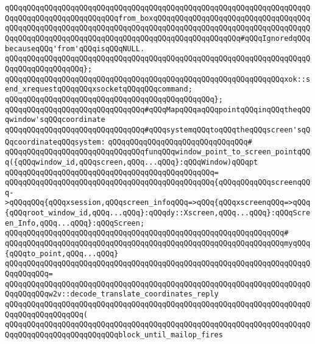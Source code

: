 \verb|qQQqqQQqqQQqqQQqqQQqqQQqqQQqqQQqqQQqqQQqqQQqqQQqqQQqqQQqqQQqqQQqqQQqqQQqqQQqqQQqqQQqqQQqqQQqqQQqfrom_boxqQQqqQQqqQQqqQQqqQQqqQQqqQQqqQQqqQQqqQQqqQQqqQQqqQQqqQQqqQQqqQQqqQQqqQQqqQQqqQQqqQQqqQQqqQQqqQQqqQQqqQQqqQQqqQQqqQQqqQQqqQQqqQQqqQQqqQQqqQQqqQQqqQQqqQQqqQQqqQQq#qQQqIgnoredqQQqbecauseqQQq'from'qQQqisqQQqNULL.|\newline
\verb|qQQqqQQqqQQqqQQqqQQqqQQqqQQqqQQqqQQqqQQqqQQqqQQqqQQqqQQqqQQqqQQqqQQqqQQqqQQqqQQqqQQqqQQq};|\newline
\newline
\verb|qQQqqQQqqQQqqQQqqQQqqQQqqQQqqQQqqQQqqQQqqQQqqQQqqQQqqQQqqQQqqQQqxok::send_xrequestqQQqqQQqxsocketqQQqqQQqcommand;|\newline
\verb|qQQqqQQqqQQqqQQqqQQqqQQqqQQqqQQqqQQqqQQqqQQqqQQq};|\newline
\newline
\verb|qQQqqQQqqQQqqQQqqQQqqQQqqQQqqQQq#qQQqMapqQQqaqQQqpointqQQqinqQQqtheqQQqwindow'sqQQqcoordinate|\newline
\verb|qQQqqQQqqQQqqQQqqQQqqQQqqQQqqQQq#qQQqsystemqQQqtoqQQqtheqQQqscreen'sqQQqcoordinateqQQqsystem:|\newline
\verb|qQQqqQQqqQQqqQQqqQQqqQQqqQQqqQQq#|\newline
\verb|qQQqqQQqqQQqqQQqqQQqqQQqqQQqqQQqfunqQQqwindow_point_to_screen_pointqQQq({qQQqwindow_id,qQQqscreen,qQQq...qQQq}:qQQqWindow)qQQqpt|\newline
\verb|qQQqqQQqqQQqqQQqqQQqqQQqqQQqqQQqqQQqqQQqqQQqqQQq=|\newline
\verb|qQQqqQQqqQQqqQQqqQQqqQQqqQQqqQQqqQQqqQQqqQQqqQQq{qQQqqQQqqQQqscreenqQQq->qQQqqQQq{qQQqxsession,qQQqscreen_infoqQQq=>qQQq{qQQqxscreenqQQq=>qQQq{qQQqroot_window_id,qQQq...qQQq}:qQQqdy::Xscreen,qQQq...qQQq}:qQQqScreen_Info,qQQq...qQQq}:qQQqScreen;|\newline
\verb|qQQqqQQqqQQqqQQqqQQqqQQqqQQqqQQqqQQqqQQqqQQqqQQqqQQqqQQqqQQqqQQq#|\newline
\verb|qQQqqQQqqQQqqQQqqQQqqQQqqQQqqQQqqQQqqQQqqQQqqQQqqQQqqQQqqQQqqQQqmyqQQq{qQQqto_point,qQQq...qQQq}|\newline
\verb|qQQqqQQqqQQqqQQqqQQqqQQqqQQqqQQqqQQqqQQqqQQqqQQqqQQqqQQqqQQqqQQqqQQqqQQqqQQqqQQq=|\newline
\verb|qQQqqQQqqQQqqQQqqQQqqQQqqQQqqQQqqQQqqQQqqQQqqQQqqQQqqQQqqQQqqQQqqQQqqQQqqQQqqQQqw2v::decode_translate_coordinates_reply|\newline
\verb|qQQqqQQqqQQqqQQqqQQqqQQqqQQqqQQqqQQqqQQqqQQqqQQqqQQqqQQqqQQqqQQqqQQqqQQqqQQqqQQqqQQqqQQq(|\newline
\verb|qQQqqQQqqQQqqQQqqQQqqQQqqQQqqQQqqQQqqQQqqQQqqQQqqQQqqQQqqQQqqQQqqQQqqQQqqQQqqQQqqQQqqQQqqQQqqQQqblock_until_mailop_fires|\newline
